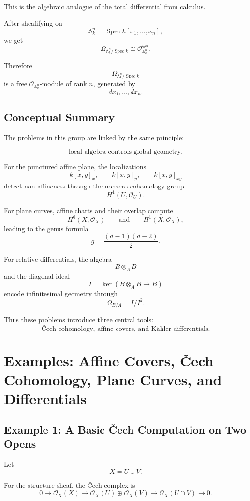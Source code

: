 \documentclass[12pt,a4paper]{article}
\theoremstyle{notespace}
\begin{document}
This is the algebraic analogue of the total differential from calculus.

After sheafifying on
\[
\mathbb A_k^n=\operatorname{Spec}k[x_1,\ldots,x_n],
\]
we get
\[
\Omega_{\mathbb A_k^n/\operatorname{Spec}k}
\cong
\mathcal O_{\mathbb A_k^n}^{\oplus n}.
\]

Therefore
\[
\Omega_{\mathbb A_k^n/\operatorname{Spec}k}
\]
is a free $\mathcal O_{\mathbb A_k^n}$-module of rank $n$, generated by
\[
dx_1,\ldots,dx_n.
\]

\subsection{Conceptual Summary}

The problems in this group are linked by the same principle:

\[
\boxed{
	\text{local algebra controls global geometry.}
}
\]

For the punctured affine plane, the localizations
\[
k[x,y]_x,
\qquad
k[x,y]_y,
\qquad
k[x,y]_{xy}
\]
detect non-affineness through the nonzero cohomology group
\[
H^1(U,\mathcal O_U).
\]

For plane curves, affine charts and their overlap compute
\[
H^0(X,\mathcal O_X)
\qquad\text{and}\qquad
H^1(X,\mathcal O_X),
\]
leading to the genus formula
\[
g=\frac{(d-1)(d-2)}2.
\]

For relative differentials, the algebra
\[
B\otimes_A B
\]
and the diagonal ideal
\[
I=\ker(B\otimes_A B\to B)
\]
encode infinitesimal geometry through
\[
\Omega_{B/A}=I/I^2.
\]

Thus these problems introduce three central tools:
\[
\boxed{
	\text{\v{C}ech cohomology, affine covers, and K\"ahler differentials.}
}
\]
\section{Examples: Affine Covers, \v{C}ech Cohomology, Plane Curves, and Differentials}

\subsection{Example 1: A Basic \v{C}ech Computation on Two Opens}

Let
\[
X=U\cup V.
\]

For the structure sheaf, the \v{C}ech complex is
\[
0
\longrightarrow
\mathcal O_X(X)
\longrightarrow
\mathcal O_X(U)\oplus\mathcal O_X(V)
\longrightarrow
\mathcal O_X(U\cap V)
\longrightarrow 0.
\]
\end{document}
